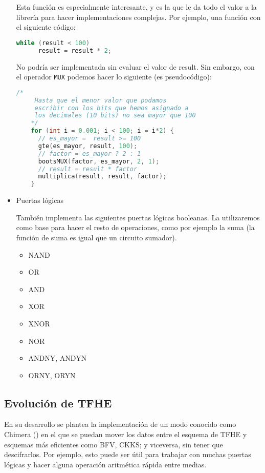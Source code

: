 \begin{itemize}
  Esta función es especialmente interesante, y es la que le da todo el valor a la librería para hacer implementaciones complejas. Por ejemplo, una función con el siguiente código:

  \begin{lstlisting}[language=c++]
    while (result < 100)
      result = result * 2;
  \end{lstlisting}

  No podría ser implementada sin evaluar el valor de result. Sin embargo, con el operador \verb|MUX| podemos hacer lo siguiente (es pseudocódigo):

  \begin{lstlisting}[language=c++]
    /*
     Hasta que el menor valor que podamos
     escribir con los bits que hemos asignado a
     los decimales (10 bits) no sea mayor que 100
    */
    for (int i = 0.001; i < 100; i = i*2) {
      // es_mayor =  result >= 100
      gte(es_mayor, result, 100);
      // factor = es_mayor ? 2 : 1
      bootsMUX(factor, es_mayor, 2, 1);
      // result = result * factor
      multiplica(result, result, factor);
    }
  \end{lstlisting}

  \item Puertas lógicas

  También implementa las siguientes puertas lógicas booleanas. La utilizaremos como base para hacer el resto de operaciones, como por ejemplo la suma (la función de suma es igual que un circuito sumador).

  \begin{itemize}
    \item NAND

    \item OR

    \item AND

    \item XOR

    \item XNOR

    \item NOR

    \item ANDNY, ANDYN

    \item ORNY, ORYN

  \end{itemize}

\end{itemize}

\subsection{Evolución de TFHE}

En su desarrollo se plantea la implementación de un modo conocido como Chimera (\cite{boura_chimera:_2018}) en el que se puedan mover los datos entre el esquema de TFHE y esquemas más eficientes como BFV, CKKS; y viceversa, sin tener que descifrarlos. Por ejemplo, esto puede ser útil para trabajar con muchas puertas lógicas y hacer alguna operación aritmética rápida entre medias.
